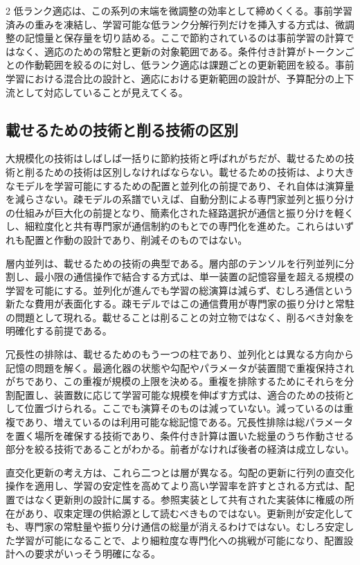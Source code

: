 \documentclass[lualatex,a4paper,10pt]{jlreq}
\begin{document}
\begin{multicols}{2}
低ランク適応は、この系列の末端を微調整の効率として締めくくる。事前学習済みの重みを凍結し、学習可能な低ランク分解行列だけを挿入する方式は、微調整の記憶量と保存量を切り詰める\autocite{lora}。ここで節約されているのは事前学習の計算ではなく、適応のための常駐と更新の対象範囲である。条件付き計算がトークンごとの作動範囲を絞るのに対し、低ランク適応は課題ごとの更新範囲を絞る。事前学習における混合比の設計と、適応における更新範囲の設計が、予算配分の上下流として対応していることが見えてくる。

\subsection{載せるための技術と削る技術の区別}
大規模化の技術はしばしば一括りに節約技術と呼ばれがちだが、載せるための技術と削るための技術は区別しなければならない。載せるための技術は、より大きなモデルを学習可能にするための配置と並列化の前提であり、それ自体は演算量を減らさない。疎モデルの系譜でいえば、自動分割による専門家並列と振り分けの仕組みが巨大化の前提となり\autocite{gshard}、簡素化された経路選択が通信と振り分けを軽くし\autocite{switcht}、細粒度化と共有専門家が通信制約のもとでの専門化を進めた\autocite{deepseekmoe}。これらはいずれも配置と作動の設計であり、削減そのものではない。

層内並列は、載せるための技術の典型である。層内部のテンソルを行列並列に分割し、最小限の通信操作で結合する方式は、単一装置の記憶容量を超える規模の学習を可能にする\autocite{megatron}。並列化が進んでも学習の総演算は減らず、むしろ通信という新たな費用が表面化する。疎モデルではこの通信費用が専門家の振り分けと常駐の問題として現れる。載せることは削ることの対立物ではなく、削るべき対象を明確化する前提である。

冗長性の排除は、載せるためのもう一つの柱であり、並列化とは異なる方向から記憶の問題を解く。最適化器の状態や勾配やパラメータが装置間で重複保持されがちであり、この重複が規模の上限を決める。重複を排除するためにそれらを分割配置し、装置数に応じて学習可能な規模を伸ばす方式は、適合のための技術として位置づけられる\autocite{zero}。ここでも演算そのものは減っていない。減っているのは重複であり、増えているのは利用可能な総記憶である。冗長性排除は総パラメータを置く場所を確保する技術であり、条件付き計算は置いた総量のうち作動させる部分を絞る技術であることがわかる。前者がなければ後者の経済は成立しない。

直交化更新の考え方は、これら二つとは層が異なる。勾配の更新に行列の直交化操作を適用し、学習の安定性を高めてより高い学習率を許すとされる方式は、配置ではなく更新則の設計に属する\autocite{muon}。参照実装として共有された実装体に権威の所在があり、収束定理の供給源として読むべきものではない。更新則が安定化しても、専門家の常駐量や振り分け通信の総量が消えるわけではない。むしろ安定した学習が可能になることで、より細粒度な専門化への挑戦が可能になり、配置設計への要求がいっそう明確になる。


\end{multicols}
\end{document}
